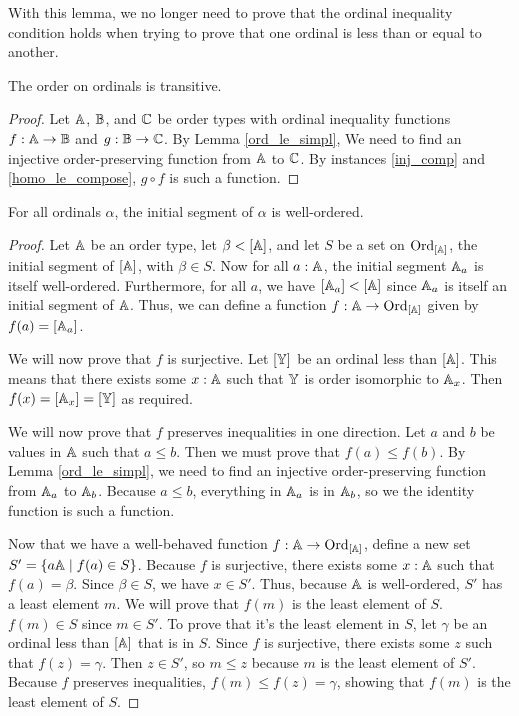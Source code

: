 \documentclass[../../math.tex]{subfiles}
\begin{document}
With this lemma, we no longer need to prove that the ordinal inequality
condition holds when trying to prove that one ordinal is less than or equal to
another.

\begin{instance}
    The order on ordinals is transitive.
\end{instance}
\begin{proof}
    Let $\mathbb{A}$, $\mathbb{B}$, and $\mathbb{C}$ be order types with ordinal inequality functions $f
    : \mathbb{A} \to \mathbb{B}$ and $g : \mathbb{B} \to \mathbb{C}$.  By Lemma \ref{ord_le_simpl}, We need to
    find an injective order-preserving function from $\mathbb{A}$ to $\mathbb{C}$.  By instances
    \ref{inj_comp} and \ref{homo_le_compose}, $g \circ f$ is such a function.
\end{proof}

\begin{lemma} \label{ords_lt_wo}
    For all ordinals $\alpha$, the initial segment of $\alpha$ is well-ordered.
\end{lemma}
\begin{proof}
    Let $\mathbb{A}$ be an order type, let $\beta < [\mathbb{A}]$, and let $S$ be a set on
    $\operatorname{Ord}_{[\mathbb{A}]}$, the initial segment of $[\mathbb{A}]$, with $\beta \in S$.  Now for
    all $a : \mathbb{A}$, the initial segment $\mathbb{A}_a$ is itself well-ordered.
    Furthermore, for all $a$, we have $[\mathbb{A}_a] < [\mathbb{A}]$ since $\mathbb{A}_a$ is itself an
    initial segment of $\mathbb{A}$.  Thus, we can define a function $f : \mathbb{A} \to
    \operatorname{Ord}_{[\mathbb{A}]}$ given by $f(a) = [\mathbb{A}_a]$.

    We will now prove that $f$ is surjective.  Let $[\mathbb{Y}]$ be an ordinal less
    than $[\mathbb{A}]$.  This means that there exists some $x : \mathbb{A}$ such that $\mathbb{Y}$ is
    order isomorphic to $\mathbb{A}_x$.  Then $f(x) = [\mathbb{A}_x] = [\mathbb{Y}]$ as required.

    We will now prove that $f$ preserves inequalities in one direction.  Let $a$
    and $b$ be values in $\mathbb{A}$ such that $a \leq b$.  Then we must prove that
    $f(a) \leq f(b)$.  By Lemma \ref{ord_le_simpl}, we need to find an injective
    order-preserving function from $\mathbb{A}_a$ to $\mathbb{A}_b$.  Because $a \leq b$,
    everything in $\mathbb{A}_a$ is in $\mathbb{A}_b$, so we the identity function is such a
    function.

    Now that we have a well-behaved function $f : \mathbb{A} \to \operatorname{Ord}_{[\mathbb{A}]}$, define a
    new set $S' = \{a \mathbb{A} \mid f(a) \in S\}$.  Because $f$ is surjective, there
    exists some $x : \mathbb{A}$ such that $f(a) = \beta$.  Since $\beta \in S$, we have
    $x \in S'$.  Thus, because $\mathbb{A}$ is well-ordered, $S'$ has a least element
    $m$.  We will prove that $f(m)$ is the least element of $S$.  $f(m) \in S$
    since $m \in S'$.  To prove that it's the least element in $S$, let $\gamma$
    be an ordinal less than $[\mathbb{A}]$ that is in $S$.  Since $f$ is surjective,
    there exists some $z$ such that $f(z) = \gamma$.  Then $z \in S'$, so $m
    \leq z$ because $m$ is the least element of $S'$.  Because $f$ preserves
    inequalities, $f(m) \leq f(z) = \gamma$, showing that $f(m)$ is the least
    element of $S$.
\end{proof}
\end{document}
